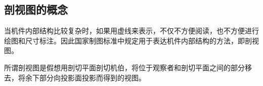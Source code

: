 \subsection{剖视图的概念}
当机件内部结构比较复杂时，如果用虚线来表示，不仅不方便阅读，也不方便进行绘图和尺寸标注。因此国家制图标准中规定用于表达机件内部结构的方法，即剖视图。

所谓剖视图是假想用剖切平面剖切机伯，将位于观察者和剖切平面之间的部分移去，将余下部分向投影面投影而得到的视图。

